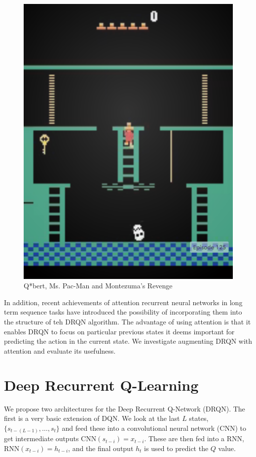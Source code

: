 \documentclass{article}
\begin{document}
\begin{figure}[h]
\begin{minipage}{0.8\textwidth}
            \centering
            \includegraphics[scale=0.15]{MontezumaRevenge}
        \end{minipage}
        \caption{Q*bert, Ms. Pac-Man and Montezuma's Revenge}
    \end{figure}

    In addition, recent achievements of attention recurrent neural networks in
    long term sequence tasks have introduced the possibility of incorporating
    them into the structure of teh DRQN algorithm.  The advantage of using
    attention is that it enables DRQN to focus on particular previous states it
    deems important for predicting the action in the current state. We investigate
    augmenting DRQN with attention and evaluate its usefulness. \\


\section{Deep Recurrent Q-Learning}
We propose two architectures for the Deep Recurrent Q-Network (DRQN). The first
is a very basic extension of DQN. We look at the last $L$ states, $\{s_{t-(L-1)},
\dots, s_{t}\}$ and feed these into a convolutional neural network (CNN) to get
intermediate outputs $\text{CNN}(s_{t-i}) = x_{t-i}$. These are then fed into a
RNN, $\text{RNN}(x_{t-i}) = h_{t-i}$, and the final output $h_t$ is used to
predict the $Q$ value.
\end{document}
